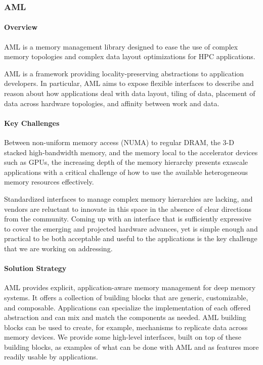 \subsubsection*{AML}

\paragraph{Overview}

AML is a memory management library designed to ease the use of complex
memory topologies and complex data layout optimizations for
HPC applications.

AML is a framework providing locality-preserving abstractions to
application developers.  In particular, AML aims to expose flexible
interfaces to describe and reason about how applications deal with data
layout, tiling of data, placement of data across hardware topologies, and
affinity between work and data.

\paragraph{Key Challenges}

Between non-uniform memory access (NUMA) to regular DRAM, the 3-D stacked
high-bandwidth memory, and the memory local to the accelerator devices such
as GPUs, the increasing depth of the memory hierarchy presents exascale
applications with a critical challenge of how to use the available
heterogeneous memory resources effectively.

Standardized interfaces to manage complex memory hierarchies are lacking,
and vendors are reluctant to innovate in this space in the absence of clear
directions from the community.  Coming up with an interface that is
sufficiently expressive to cover the emerging and projected hardware
advances, yet is simple enough and practical to be both acceptable and
useful to the applications is the key challenge that we are working on
addressing.

\paragraph{Solution Strategy}

AML provides explicit, application-aware memory management for deep memory
systems.  It offers a collection of building blocks that
are generic, customizable, and composable.
Applications can specialize the implementation of each offered abstraction
and can mix and match the components as needed.  AML building blocks can be
used to create, for example, mechanisms to replicate data across memory
devices. We provide some high-level interfaces, built on top of these
building blocks, as examples of what can be done with AML and as features
more readily usable by applications. 

